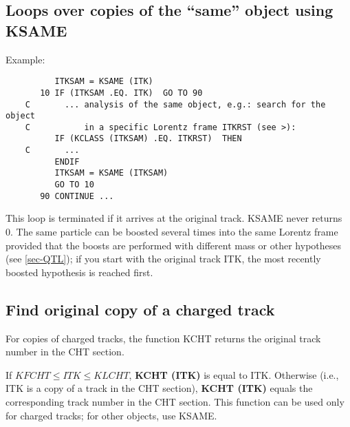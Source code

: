 \subsection{Loops over copies of the ``same'' object using KSAME}
Example:
\begin{verbatim}
          ITKSAM = KSAME (ITK)
       10 IF (ITKSAM .EQ. ITK)  GO TO 90
    C       ... analysis of the same object, e.g.: search for the object
    C           in a specific Lorentz frame ITKRST (see >):
          IF (KCLASS (ITKSAM) .EQ. ITKRST)  THEN
    C       ...
          ENDIF
          ITKSAM = KSAME (ITKSAM)
          GO TO 10
       90 CONTINUE ...
\end{verbatim}
\begin{indentlist}{ 2.50cm}{ 2.75cm}
This loop is terminated if it arrives at the original track.
KSAME never returns 0.
The same particle can be boosted several times into the same
Lorentz frame provided that the boosts are performed with
different mass or other hypotheses (see
\ref{sec-QTL}); if you start with the original track ITK,
the most recently boosted hypothesis is reached first.
\end{indentlist}
\par
\subsection{\label{sec-KCHT}Find original copy of a charged track}
For copies of charged tracks, the function KCHT returns the original
track number in the CHT section.
\begin{indentlist}{ 3.50cm}{ 3.75cm}
If $
KFCHT\leq ITK\leq KLCHT
$,
{\bf KCHT (ITK)} is equal to ITK. Otherwise (i.e., ITK is a
copy of a track in the CHT section),
{\bf KCHT (ITK)}
equals the corresponding track number in the CHT section.
This function can be used only for charged tracks; for other objects,
use KSAME.
\end{indentlist}
